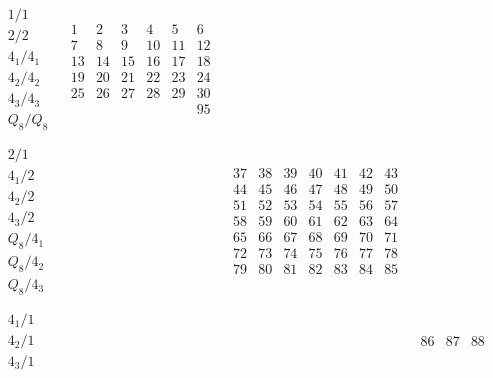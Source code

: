 \documentclass[12pt,a4paper]{amsart}
\begin{document}
\begin{align*}
  \begin{array}{r||c|c|c|c|c}
    \begin{array}{r}
      1/1 \\
      2/2 \\
      4_1/4_1 \\
      4_2/4_2 \\
      4_3/4_3 \\
      Q_8/Q_8 \\
    \end{array}
&
  \begin{array}{cccccc}
1&2&3&4&5&6\\
7&8&9&10&11&12\\
13&14&15&16&17&18\\
19&20&21&22&23&24\\
25&26&27&28&29&30\\
&&&&&95\\
  \end{array}
&&&& \\ \hline
    \begin{array}{r}
      2/1 \\
      4_1/2 \\
      4_2/2 \\
      4_3/2 \\
      Q_8/4_1 \\
      Q_8/4_2 \\
      Q_8/4_3 \\
    \end{array}
&&
   \begin{array}{cccccccc}
37&38&39&40&41&42&43\\
44&45&46&47&48&49&50\\
51&52&53&54&55&56&57\\
58&59&60&61&62&63&64\\
65&66&67&68&69&70&71\\
72&73&74&75&76&77&78\\
79&80&81&82&83&84&85\\
   \end{array}
&&& \\ \hline
    \begin{array}{r}
      4_1/1 \\
      4_2/1 \\
      4_3/1 \\
    \end{array}
&&&
    \begin{array}{ccc}
      86&87&88\\

\end{array}
\end{array}
\end{align*}
\end{document}
